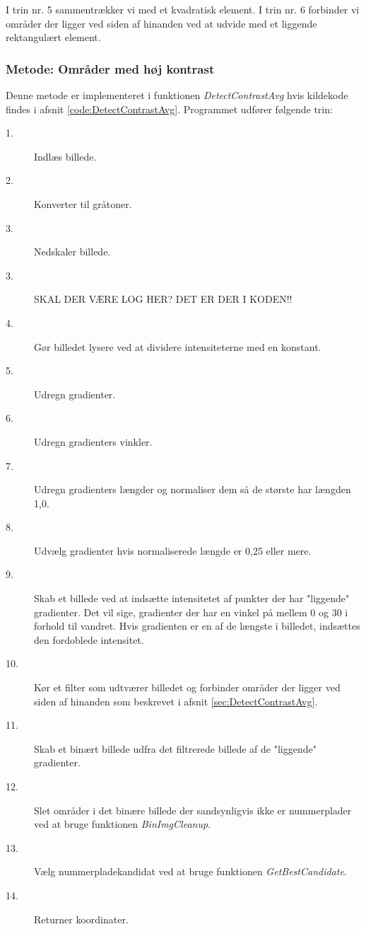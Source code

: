 I trin nr. 5 sammentrækker vi med et kvadratisk element. I trin nr. 6 forbinder vi områder der ligger ved siden af hinanden ved at udvide med et liggende rektangulært element. 


\subsubsection{Metode: Områder med høj kontrast}
Denne metode er implementeret i funktionen \textit{DetectContrastAvg} hvis kildekode findes i afsnit \vref{code:DetectContrastAvg}. Programmet udfører følgende trin:

\begin{description}
\item[1.] Indlæs billede.
\item[2.] Konverter til gråtoner.
\item[3.] Nedskaler billede.
\item[3.] SKAL DER VÆRE LOG HER? DET ER DER I KODEN!!
\item[4.] Gør billedet lysere ved at dividere intensiteterne med en konstant.
\item[5.] Udregn gradienter.
\item[6.] Udregn gradienters vinkler.
\item[7.] Udregn gradienters længder og normaliser dem så de største har længden 1,0.
\item[8.] Udvælg gradienter hvis normaliserede længde er 0,25 eller mere.
\item[9.] Skab et billede ved at indsætte intensitetet af punkter der har "liggende" gradienter. Det vil sige, gradienter der har en vinkel på mellem 0 og 30 i forhold til vandret. Hvis gradienten er en af de længste i billedet, indsættes den fordoblede intensitet.
\item[10.] Kør et filter som udtværer billedet og forbinder områder der ligger ved siden af hinanden som beskrevet i afsnit \ref{sec:DetectContrastAvg}.
\item[11.] Skab et binært billede udfra det filtrerede billede af de "liggende" gradienter. 
\item[12.] Slet områder i det binære billede der sandsynligvis ikke er nummerplader ved at bruge funktionen \textit{BinImgCleanup}.
\item[13.] Vælg nummerpladekandidat ved at bruge funktionen \textit{GetBestCandidate}.
\item[14.] Returner koordinater.
\end{description}

